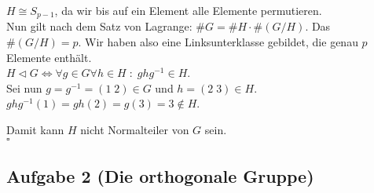 \documentclass[11pt,a4paper,ngerman]{article}
\begin{document}
$H \cong S_{p-1}$, da wir bis auf ein Element alle Elemente permutieren.\\

Nun gilt nach dem Satz von Lagrange: $\# G = \# H \cdot \# (G / H)$. Das $\# (G / H ) = p$. Wir haben also eine Linksunterklasse gebildet, die genau $p$ Elemente enthält.\\

$H \vartriangleleft G \Leftrightarrow \forall g\in G \forall h \in H \; : \; ghg^{-1} \in H$.\\
Sei nun $g=g^{-1}=(1 \; 2) \in G$ und $h = (2 \; 3) \in H$.\\

$ghg^{-1} (1) = gh (2) = g (3) = 3 \not \in H$.

Damit kann $H$ nicht Normalteiler von $G$ sein.\\
\mbox{} \hfill $\square$

\pagebreak

\subsection*{Aufgabe 2 \mdseries (Die orthogonale Gruppe)}
\end{document}

